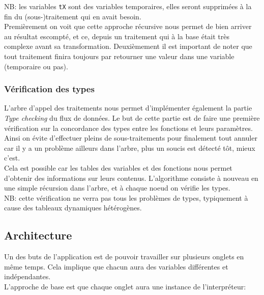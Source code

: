 \documentclass[french]{article}
\begin{document}
				NB: les variables \texttt{tX} sont des variables temporaires, elles seront supprimées à la fin du (sous-)traitement qui en avait besoin.\\
				
				Premièrement on voit que cette approche récursive nous permet de bien arriver au résultat escompté, et ce, depuis un traitement qui à la base était très complexe avant sa transformation. Deuxièmement il est important de noter que tout traitement finira toujours par retourner une valeur dans une variable (temporaire ou pas).
			
			\subsubsection{Vérification des types}
				\label{subsubsec:verification-des-types}
				L'arbre d'appel des traitements nous permet d'implémenter également la partie \textit{Type checking} du flux de données. Le but de cette partie est de faire une première vérification sur la concordance des types entre les fonctions et leurs paramètres. Ainsi on évite d'effectuer pleins de sous-traitements pour finalement tout annuler car il y a un problème ailleurs dans l'arbre, plus un soucis est détecté tôt, mieux c'est.\\
				
				Cela est possible car les tables des variables et des fonctions nous permet d'obtenir des informations sur leurs contenus. L'algorithme consiste à nouveau en une simple récursion dans l'arbre, et à chaque noeud on vérifie les types.\\
				
				NB: cette vérification ne verra pas tous les problèmes de types, typiquement à cause des tableaux dynamiques hétérogènes.
			
		\subsection{Architecture}
			Un des buts de l'application est de pouvoir travailler sur plusieurs onglets en même temps. Cela implique que chacun aura des variables différentes et indépendantes.\\
			
			L'approche de base est que chaque onglet aura une instance de l'interpréteur:
			
			\begin{figure}[H]
				\centering
			\end{figure}
			
\end{document}
